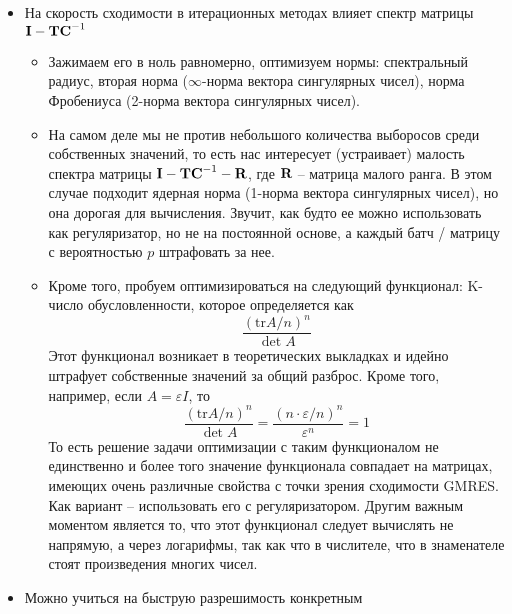 \documentclass[a4paper, 12pt]{article}
\begin{document}
\begin{itemize}
    \item На скорость сходимости в итерационных методах
        влияет спектр матрицы $\textbf I - \textbf T\textbf C^{-1}$
        \begin{itemize}
            \item Зажимаем его в ноль равномерно,
                оптимизуем нормы: спектральный радиус,
                вторая норма ($\infty$-норма вектора
                сингулярных чисел), норма Фробениуса (2-норма вектора 
                сингулярных чисел).
            \item На самом деле мы не против небольшого количества
                выборосов среди собственных значений, то есть
                нас интересует (устраивает) малость спектра матрицы
                $\textbf I - \textbf T\textbf C^{-1} - \textbf R$, где
                $\textbf R$ -- матрица малого ранга. 
                В этом случае подходит ядерная норма (1-норма вектора
                сингулярных чисел), но она дорогая для
                вычисления. Звучит, как будто ее можно использовать
                как регуляризатор, но не на постоянной основе, а каждый
                батч / матрицу с вероятностью $p$ штрафовать за нее.
            \item Кроме того, пробуем оптимизироваться на 
                следующий функционал: K-число обусловленности, которое
                определяется как
                \[
                    \frac{(\mathrm{tr} A/n)^n}{\det A}
                \]
                Этот функционал возникает в теоретических выкладках и
                идейно штрафует собственные значений за общий разброс.
                Кроме того, например, если $A=\varepsilon I$, то
                \[
                    \frac{(\mathrm{tr} A/n)^n}{\det A}=
                    \frac{(n\cdot \varepsilon / n)^n}{\varepsilon^n}=1
                \]
                То есть решение задачи оптимизации с таким функционалом
                не единственно и более того значение функционала
                совпадает на матрицах, имеющих
                очень различные свойства с точки зрения сходимости GMRES.
                Как вариант -- использовать его с регуляризатором.
                Другим важным моментом является то, что
                этот функционал следует вычислять не напрямую, а через
                логарифмы, так как что в числителе, что в 
                знаменателе стоят произведения многих чисел.
        \end{itemize}
    \item Можно учиться на быструю разрешимость конкретным

\end{itemize}
\end{document}
